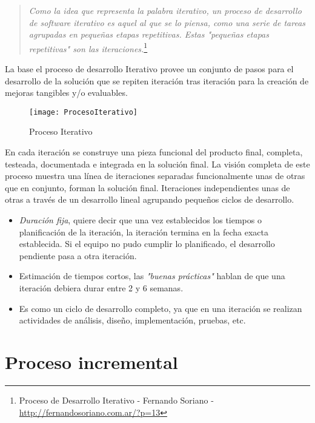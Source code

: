 \begin{quote}
    \emph{Como la idea que representa la palabra iterativo, un proceso de desarrollo de software iterativo es aquel al que se lo piensa, como una serie de tareas agrupadas en pequeñas etapas repetitivas. Estas "pequeñas etapas repetitivas" son las iteraciones.}\footnote{Proceso de Desarrollo Iterativo - Fernando Soriano - \url{http://fernandosoriano.com.ar/?p=13}}
\end{quote}

\par La base el proceso de desarrollo Iterativo provee un conjunto de pasos para el desarrollo de la solución que se repiten iteración tras iteración para la creación de mejoras tangibles y/o evaluables. 

\begin{figure}[htp]
    \centering
    \texttt{[image: ProcesoIterativo]}
    \caption{Proceso Iterativo}
    \label{fig:ProcesoIterativo}
\end{figure}

\par En cada iteración se construye una pieza funcional del producto final, completa, testeada, documentada e integrada en la solución final. La visión completa de este proceso muestra una línea de iteraciones separadas funcionalmente unas de otras que en conjunto, forman la solución final. Iteraciones independientes unas de otras a través de un desarrollo lineal agrupando pequeños ciclos de desarrollo.

\begin{itemize}
	\item \emph{Duración fija}, quiere decir que una vez establecidos los tiempos o planificación de la iteración, la iteración termina en la fecha exacta establecida. Si el equipo no pudo cumplir lo planificado, el desarrollo pendiente pasa a otra iteración.
	\item Estimación de tiempos cortos, las \emph{"buenas prácticas"} hablan de que una iteración debiera durar entre 2 y 6 semanas.
	\item Es como un ciclo de desarrollo completo, ya que en una iteración se realizan actividades de análisis, diseño, implementación, pruebas, etc.
\end{itemize}


\section{Proceso incremental}
\label{sec:proc-incremental}

